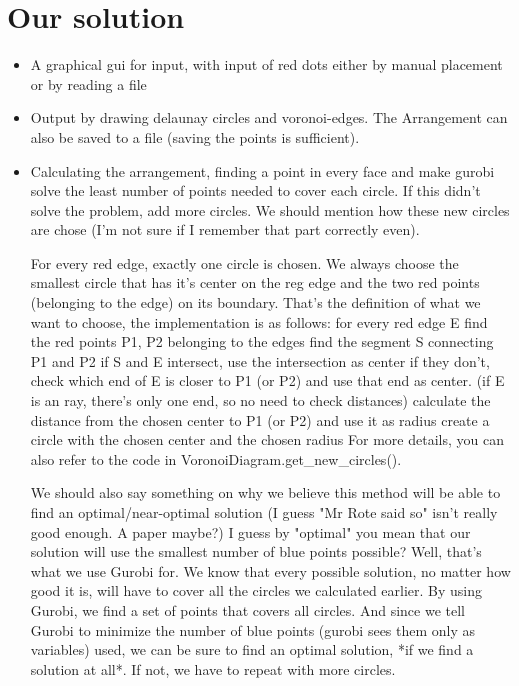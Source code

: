 \documentclass[a4paper,12pt]{article}
\begin{document}
\section{Our solution}
\begin{itemize}
\item
A graphical gui for input, with input of red dots either by manual placement or by reading a file
\item
Output by drawing delaunay circles and voronoi-edges.
The Arrangement can also be saved to a file (saving the points is sufficient).
\item
Calculating the arrangement, finding a point in every face and make gurobi solve the least number of points needed to cover each circle.
If this didn't solve the problem, add more circles. We should mention how these new circles are chose (I'm not sure if I remember that part correctly even). 

For every red edge, exactly one circle is chosen. We always choose the smallest circle that has it's center on the reg edge and the two red points (belonging to the edge) on its boundary.
That's the definition of what we want to choose, the implementation is as follows:
	for every red edge E {
		find the red points P1, P2 belonging to the edges
		find the segment S connecting P1 and P2
		if S and E intersect, use the intersection as center
		if they don't, check which end of E is closer to P1 (or P2) and use that end as center. (if E is an ray, there's only one end, so no need to check distances)
		calculate the distance from the chosen center to P1 (or P2) and use it as radius
		create a circle with the chosen center and the chosen radius
		}
For more details, you can also refer to the code in VoronoiDiagram.get_new_circles().

We should also say something on why we believe this method will be able to find an optimal/near-optimal solution (I guess "Mr Rote said so" isn't really good enough. A paper maybe?)
I guess by "optimal" you mean that our solution will use the smallest number of blue points possible? Well, that's what we use Gurobi for. 
We know that every possible solution, no matter how good it is, will have to cover all the circles we calculated earlier.
By using Gurobi, we find a set of points that covers all circles. And since we tell Gurobi to minimize the number of blue points (gurobi sees them only as variables) used, we can be sure to find an optimal solution, *if we find a solution at all*. If not, we have to repeat with more circles.
\end{itemize}
\end{document}

